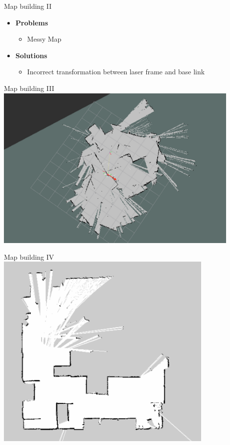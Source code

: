 \begin{frame}{Map building II}
\begin{itemize}
	\item \textbf{Problems}
		\begin{itemize}
			\item Messy Map
		\end{itemize}
	\item \textbf{Solutions}
		\begin{itemize}
			\item Incorrect transformation between laser frame and base link
		\end{itemize}
\end{itemize}
\end{frame}
\begin{frame}{Map building III}
    \centering
    \includegraphics[width=0.9\textwidth]{gfx/map_messy.png}
\end{frame}
\begin{frame}{Map building IV}
\centering
\includegraphics[width=0.8\textwidth]{gfx/map.png}
\end{frame}
